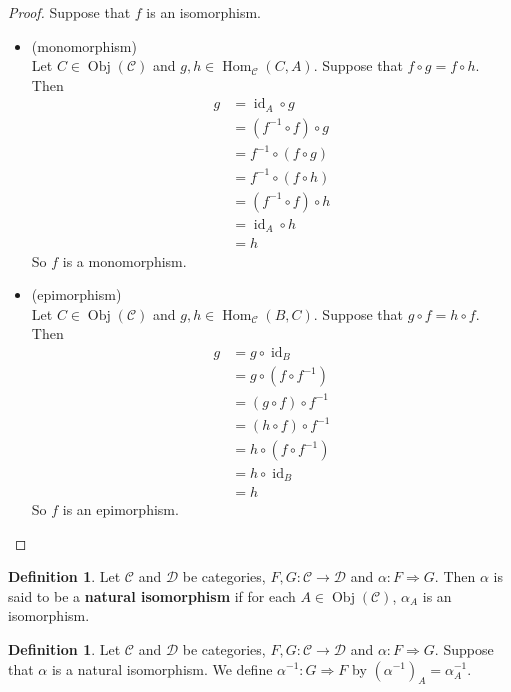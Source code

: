 \documentclass[12pt]{amsart}
\theoremstyle{definition}
\newtheorem{defn}[definition]{Definition}
\newcommand{\al}{\alpha}
\newcommand{\MC}{\mathcal{C}}
\newcommand{\MD}{\mathcal{D}}
\DeclareMathOperator{\id}{id}
\DeclareMathOperator{\Obj}{Obj}
\DeclareMathOperator{\Hom}{Hom}
\DeclareMathOperator*{\0}{\mbf{0}}
\DeclareMathOperator*{\1}{\mbf{1}}
\newcommand{\ld}[1]{\label{defn:#1}}
\begin{document}
	\begin{proof}
		Suppose that $f$ is an isomorphism. 
		\begin{itemize}
			\item (monomorphism) \\
			Let $C \in \Obj(\MC)$ and $g, h \in \Hom_{\MC}(C, A)$. Suppose that $f \circ g = f \circ h$. Then
			\begin{align*}
				g 
				& = \id_A \circ g \\
				& = (f^{-1} \circ f) \circ g \\
				& = f^{-1} \circ (f \circ g) \\
				& = f^{-1} \circ (f \circ h) \\
				& = (f^{-1} \circ f) \circ h \\
				& = \id_A \circ h \\
				& = h
			\end{align*}
			So $f$ is a monomorphism.
			\item  (epimorphism) \\
			Let $C \in \Obj(\MC)$ and $g, h \in \Hom_{\MC}(B, C)$. Suppose that $ g \circ f = h \circ f$. Then
			\begin{align*}
				g 
				& = g \circ \id_B \\
				& = g \circ (f \circ f^{-1}) \\
				& = (g \circ f) \circ f^{-1} \\
				& = (h \circ f) \circ f^{-1} \\
				& = h \circ (f \circ f^{-1}) \\
				& = h \circ \id_B \\
				& = h
			\end{align*}
			So $f$ is an epimorphism.
		\end{itemize}
	\end{proof}
	
	\begin{defn} \ld{15011.1}
		Let $\MC$ and $\MD$ be categories, $F,G: \MC \rightarrow \MD$ and $\al : F \Rightarrow G$. Then $\al$ is said to be a \textbf{natural isomorphism} if for each $A \in \Obj(\MC)$, $\al_A$ is an isomorphism.
	\end{defn}

	\begin{defn} \ld{15011.2}
		Let $\MC$ and $\MD$ be categories, $F,G: \MC \rightarrow \MD$ and $\al : F \Rightarrow G$. Suppose that $\al$ is a natural isomorphism. We define $\al^{-1}: G \Rightarrow F$ by $(\al^{-1})_A = \al_A^{-1}$. 
	\end{defn}
\end{document}
